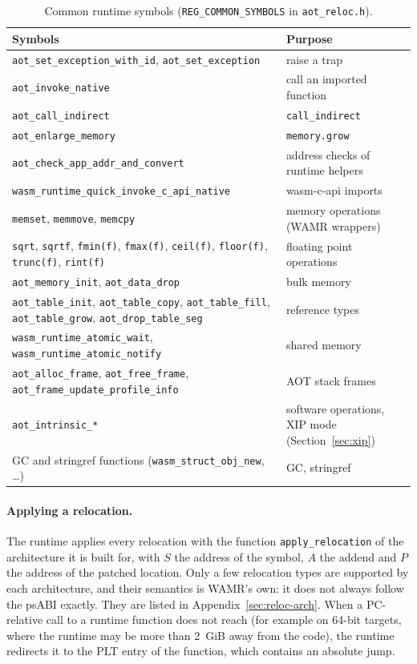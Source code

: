 \documentclass{article}
\begin{document}
\begin{table}[H]
\centering
\begin{tabular}{p{6.2cm}p{6.8cm}}
    \hline
    Symbols & Purpose \\
    \hline
    \verb|aot_set_exception_with_id|, \verb|aot_set_exception| & raise a trap \\
    \verb|aot_invoke_native| & call an imported function \\
    \verb|aot_call_indirect| & \verb|call_indirect| \\
    \verb|aot_enlarge_memory| & \verb|memory.grow| \\
    \verb|aot_check_app_addr_and_convert| & address checks of runtime helpers \\
    \verb|wasm_runtime_quick_invoke_c_api_native| & wasm-c-api imports \\
    \verb|memset|, \verb|memmove|, \verb|memcpy| & memory operations (WAMR wrappers) \\
    \verb|sqrt|, \verb|sqrtf|, \verb|fmin(f)|, \verb|fmax(f)|, \verb|ceil(f)|, \verb|floor(f)|, \verb|trunc(f)|, \verb|rint(f)| & floating point operations \\
    \verb|aot_memory_init|, \verb|aot_data_drop| & bulk memory \\
    \verb|aot_table_init|, \verb|aot_table_copy|, \verb|aot_table_fill|, \verb|aot_table_grow|, \verb|aot_drop_table_seg| & reference types \\
    \verb|wasm_runtime_atomic_wait|, \verb|wasm_runtime_atomic_notify| & shared memory \\
    \verb|aot_alloc_frame|, \verb|aot_free_frame|, \verb|aot_frame_update_profile_info| & AOT stack frames \\
    \verb|aot_intrinsic_*| & software operations, XIP mode (Section~\ref{sec:xip}) \\
    GC and stringref functions (\verb|wasm_struct_obj_new|, \dots) & GC, stringref \\
    \hline
\end{tabular}
\caption{Common runtime symbols (\texttt{REG\_COMMON\_SYMBOLS} in \texttt{aot\_reloc.h}).}
\label{table:runtime-symbols}
\end{table}

\paragraph{Applying a relocation.}
The runtime applies every relocation with the function \verb|apply_relocation| of the architecture it is built for, with $S$ the address of the symbol, $A$ the addend and $P$ the address of the patched location.
Only a few relocation types are supported by each architecture, and their semantics is WAMR's own: it does not always follow the psABI exactly.
They are listed in Appendix~\ref{sec:reloc-arch}.
When a PC-relative call to a runtime function does not reach (for example on 64-bit targets, where the runtime may be more than 2~GiB away from the code), the runtime redirects it to the PLT entry of the function, which contains an absolute jump.
\end{document}
